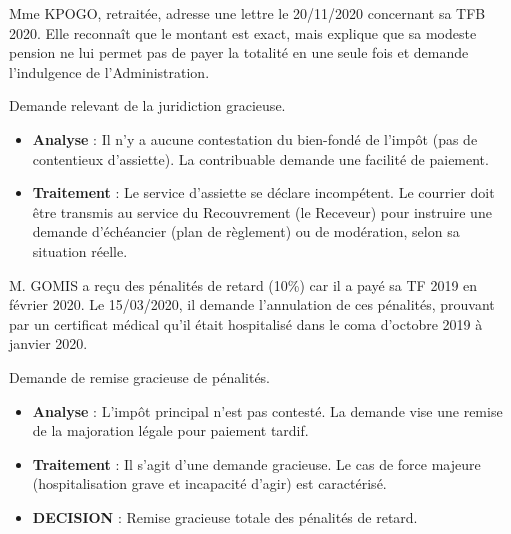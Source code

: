 \documentclass[a4paper, 11pt]{exam}
\begin{document}
\begin{questions}
		\question Mme KPOGO, retraitée, adresse une lettre le 20/11/2020 concernant sa TFB 2020. Elle reconnaît que le montant est exact, mais explique que sa modeste pension ne lui permet pas de payer la totalité en une seule fois et demande l'indulgence de l'Administration.
		\begin{solution}
			Demande relevant de la juridiction gracieuse.
			\begin{itemize}
				\item \textbf{Analyse} : Il n'y a aucune contestation du bien-fondé de l'impôt (pas de contentieux d'assiette). La contribuable demande une facilité de paiement.
				\item \textbf{Traitement} : Le service d'assiette se déclare incompétent. Le courrier doit être transmis au service du Recouvrement (le Receveur) pour instruire une demande d'échéancier (plan de règlement) ou de modération, selon sa situation réelle.
			\end{itemize}
		\end{solution}
		
		\question M. GOMIS a reçu des pénalités de retard (10\%) car il a payé sa TF 2019 en février 2020. Le 15/03/2020, il demande l'annulation de ces pénalités, prouvant par un certificat médical qu'il était hospitalisé dans le coma d'octobre 2019 à janvier 2020.
		\begin{solution}
			Demande de remise gracieuse de pénalités.
			\begin{itemize}
				\item \textbf{Analyse} : L'impôt principal n'est pas contesté. La demande vise une remise de la majoration légale pour paiement tardif.
				\item \textbf{Traitement} : Il s'agit d'une demande gracieuse. Le cas de force majeure (hospitalisation grave et incapacité d'agir) est caractérisé.
				\item \textbf{DECISION} : Remise gracieuse totale des pénalités de retard.
			\end{itemize}
		\end{solution}
		
		

\end{questions}
\end{document}
